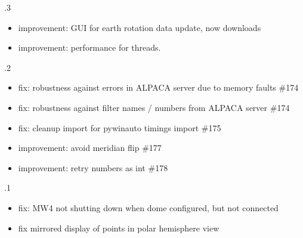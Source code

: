 \documentclass[a4paper,10pt,english]{sphinxmanual}
\begin{document}
.3
\begin{itemize}
\item {} 
\sphinxAtStartPar
improvement: GUI for earth rotation data update, now downloads

\item {} 
\sphinxAtStartPar
improvement: performance for threads.

\end{itemize}

.2
\begin{itemize}
\item {} 
\sphinxAtStartPar
fix: robustness against errors in ALPACA server due to memory faults \#174

\item {} 
\sphinxAtStartPar
fix: robustness against filter names / numbers from ALPACA server \#174

\item {} 
\sphinxAtStartPar
fix: cleanup import for pywinauto timings import \#175

\item {} 
\sphinxAtStartPar
improvement: avoid meridian flip \#177

\item {} 
\sphinxAtStartPar
improvement: retry numbers as int \#178

\end{itemize}

.1
\begin{itemize}
\item {} 
\sphinxAtStartPar
fix: MW4 not shutting down when dome configured, but not connected

\item {} 
\sphinxAtStartPar
fix mirrored display of points in polar hemisphere view

\end{itemize}
\end{document}
